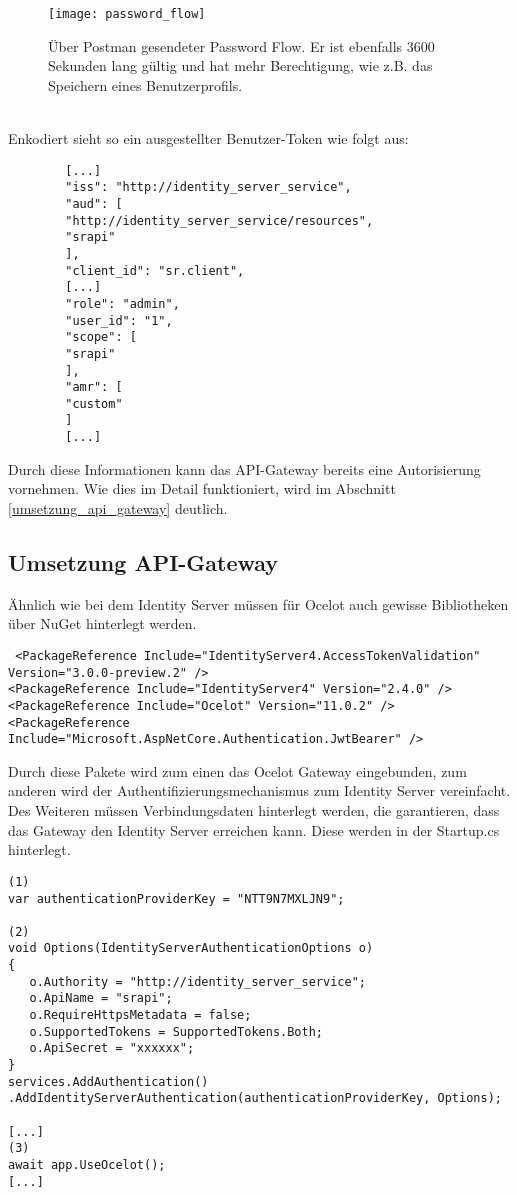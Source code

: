 \begin{figure}[!ht]
	\centering
	\texttt{[image: password\_flow]}
	\caption[Über Postman gesendeter Password Flow] {Über Postman gesendeter Password Flow. Er ist ebenfalls 3600 Sekunden lang gültig und hat mehr Berechtigung, wie z.B. das Speichern eines Benutzerprofils.}
	\label{fig:password_flow}
\end{figure} \\

Enkodiert sieht so ein ausgestellter Benutzer-Token wie folgt aus: \\

\begin{verbatim}
		[...]
		"iss": "http://identity_server_service",
		"aud": [
		"http://identity_server_service/resources",
		"srapi"
		],
		"client_id": "sr.client",
		[...]
		"role": "admin",
		"user_id": "1",
		"scope": [
		"srapi"
		],
		"amr": [
		"custom"
		]
		[...]
\end{verbatim}  

Durch diese Informationen kann das API-Gateway bereits eine Autorisierung vornehmen. Wie dies im Detail funktioniert, wird im Abschnitt \ref{umsetzung_api_gateway} deutlich. 

\subsection{Umsetzung API-Gateway}\label{sec:umsetzung_api_gateway}

Ähnlich wie bei dem Identity Server müssen für Ocelot auch gewisse Bibliotheken über NuGet hinterlegt werden.

\begin{verbatim}
 <PackageReference Include="IdentityServer4.AccessTokenValidation" Version="3.0.0-preview.2" />
<PackageReference Include="IdentityServer4" Version="2.4.0" />
<PackageReference Include="Ocelot" Version="11.0.2" />
<PackageReference Include="Microsoft.AspNetCore.Authentication.JwtBearer" />
\end{verbatim}

Durch diese Pakete wird zum einen das Ocelot Gateway eingebunden, zum anderen wird der Authentifizierungsmechanismus zum Identity Server vereinfacht. Des Weiteren müssen Verbindungsdaten hinterlegt werden, die garantieren, dass das Gateway den Identity Server erreichen kann. Diese werden in der Startup.cs hinterlegt.

\begin{verbatim}
(1)
var authenticationProviderKey = "NTT9N7MXLJN9";

(2)
void Options(IdentityServerAuthenticationOptions o)
{
   o.Authority = "http://identity_server_service";
   o.ApiName = "srapi";
   o.RequireHttpsMetadata = false;
   o.SupportedTokens = SupportedTokens.Both;
   o.ApiSecret = "xxxxxx";
}
services.AddAuthentication()
.AddIdentityServerAuthentication(authenticationProviderKey, Options);

[...]
(3)
await app.UseOcelot();
[...]
\end{verbatim}

